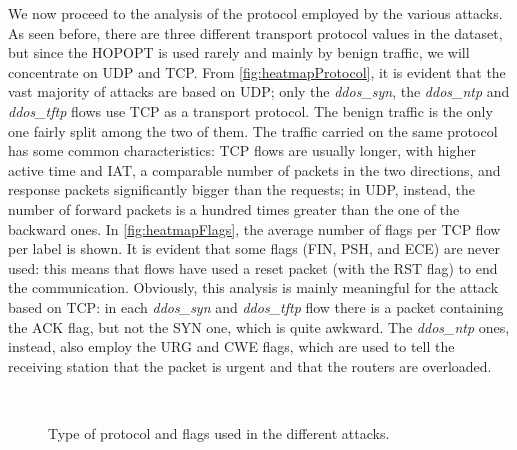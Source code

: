 \documentclass[acmlarge,nonacm]{acmart}
\begin{document}
We now proceed to the analysis of the protocol employed by the various attacks. As seen before, there are three different transport protocol values in the dataset, but since the HOPOPT is used rarely and mainly by benign traffic, we will concentrate on UDP and TCP. From \cref{fig:heatmapProtocol}, it is evident that the vast majority of attacks are based on UDP; only the \emph{ddos\_syn}, the \emph{ddos\_ntp} and \emph{ddos\_tftp} flows use TCP as a transport protocol. The benign traffic is the only one fairly split among the two of them. The traffic carried on the same protocol has some common characteristics: TCP flows are usually longer, with higher active time and IAT, a comparable number of packets in the two directions, and response packets significantly bigger than the requests; in UDP, instead, the number of forward packets is a hundred times greater than the one of the backward ones. In \cref{fig:heatmapFlags}, the average number of flags per TCP flow per label is shown. It is evident that some flags (FIN, PSH, and ECE) are never used: this means that flows have used a reset packet (with the RST flag) to end the communication. Obviously, this analysis is mainly meaningful for the attack based on TCP: in each \emph{ddos\_syn} and \emph{ddos\_tftp} flow there is a packet containing the ACK flag, but not the SYN one, which is quite awkward. The \emph{ddos\_ntp} ones, instead, also employ the URG and CWE flags, which are used to tell the receiving station that the packet is urgent and that the routers are overloaded.

\begin{figure}
	\centering
     \quad
	 \\
  	\caption{Type of protocol and flags used in the different attacks.} 
\end{figure}
\end{document}
